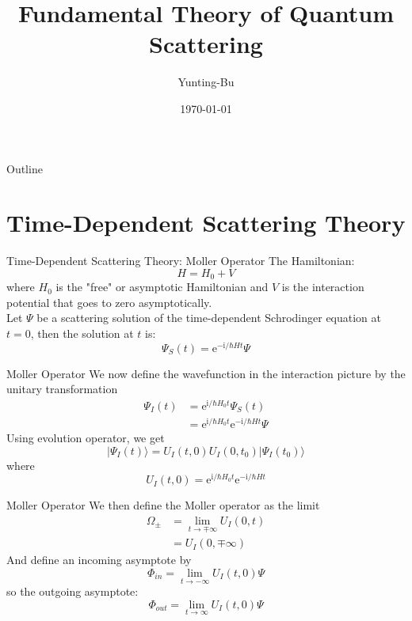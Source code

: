 \documentclass{beamer}
\title{Fundamental Theory of Quantum Scattering}
\author{Yunting-Bu}
\date{\today}
\begin{document}
	\begin{frame}
		\titlepage 
	\end{frame}
	
	\logo{}
	\begin{frame}{Outline}
		\tableofcontents
	\end{frame}
	\section{Time-Dependent Scattering Theory}
	\begin{frame}{Time-Dependent Scattering Theory: Moller Operator}
		The Hamiltonian: 
		\begin{equation}
			H=H_0+V
		\end{equation}
		where $H_0$ is the "free" or asymptotic Hamiltonian and $V$ is the interaction potential that goes to zero asymptotically.\\
		
		Let $\Psi$ be a scattering solution of the time-dependent Schrodinger equation at $t=0$, then the solution at $t$ is:
		\begin{equation}
			\Psi_S(t)=\mathrm{e}^{-\mathrm{i}/\hbar Ht}\Psi
		\end{equation}
	\end{frame}
	\begin{frame}{Moller Operator}
		We now define the wavefunction in the interaction picture by the unitary transformation
		\begin{align}
			\Psi_I(t)&=\mathrm{e}^{\mathrm{i}/\hbar H_0t}\Psi_S(t)\nonumber\\
			&=\mathrm{e}^{\mathrm{i}/\hbar H_0t}\mathrm{e}^{-\mathrm{i}/\hbar Ht}\Psi
		\end{align}
		Using evolution operator, we get
		\begin{equation}
			|\Psi_I(t)\rangle=U_I(t,0)U_I(0,t_0)|\Psi_I(t_0)\rangle
		\end{equation}
		where
		\begin{equation}
			U_I(t,0)=\mathrm{e}^{\mathrm{i}/\hbar H_0t}\mathrm{e}^{-\mathrm{i}/\hbar Ht}
		\end{equation}
	\end{frame}
	\begin{frame}{Moller Operator}
		We then define the Moller operator as the limit
		\begin{align}
			\Omega_\pm&=\lim\limits_{t\rightarrow\mp\infty}U_I(0,t)\nonumber\\
			&=U_I(0,\mp\infty)
		\end{align}	
		And define an incoming asymptote by
		\begin{equation}
			\Phi_{in}=\lim\limits_{t\rightarrow-\infty}U_I(t,0)\Psi
		\end{equation}
		so the outgoing asymptote:
		\begin{equation}
			\Phi_{out}=\lim\limits_{t\rightarrow\infty}U_I(t,0)\Psi
		\end{equation}
	\end{frame}
\end{document}
